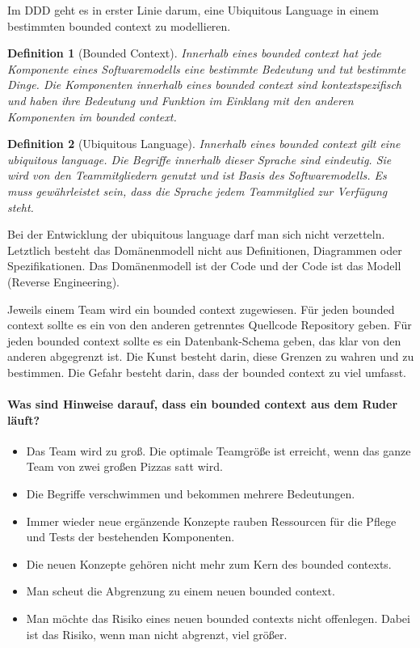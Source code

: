 \documentclass[11pt,a4paper]{scrartcl}
\newtheorem{Def}{Definition}[section]
\begin{document}
Im DDD geht es in erster Linie darum, eine Ubiquitous Language in einem bestimmten bounded context zu modellieren.

\begin{Def}[Bounded Context]
	Innerhalb eines bounded context hat jede Komponente eines Softwaremodells eine bestimmte Bedeutung und tut bestimmte Dinge. Die Komponenten innerhalb eines bounded context sind kontextspezifisch und haben ihre Bedeutung und Funktion im Einklang mit den anderen Komponenten im bounded context.
\end{Def}

\begin{Def}[Ubiquitous Language]
	Innerhalb eines bounded context gilt eine ubiquitous language. Die Begriffe innerhalb dieser Sprache sind eindeutig. Sie wird von den Teammitgliedern genutzt und ist Basis des Softwaremodells. Es muss gewährleistet sein, dass die Sprache jedem Teammitglied zur Verfügung steht.
\end{Def}

Bei der Entwicklung der ubiquitous language darf man sich nicht verzetteln. Letztlich besteht das Domänenmodell nicht aus Definitionen, Diagrammen oder Spezifikationen. Das Domänenmodell ist der Code und der Code ist das Modell (Reverse Engineering).

Jeweils einem Team wird ein bounded context zugewiesen. Für jeden bounded context sollte es ein von den anderen getrenntes Quellcode Repository geben. Für jeden bounded context sollte es ein Datenbank-Schema geben, das klar von den anderen abgegrenzt ist. Die Kunst besteht darin, diese Grenzen zu wahren und zu bestimmen. Die Gefahr besteht darin, dass der bounded context zu viel umfasst.

\paragraph{Was sind Hinweise darauf, dass ein bounded context aus dem Ruder läuft?}
\begin{itemize}
	\item Das Team wird zu groß. Die optimale Teamgröße ist erreicht, wenn das ganze Team von zwei großen Pizzas satt wird.
	\item Die Begriffe verschwimmen und bekommen mehrere Bedeutungen.
	\item Immer wieder neue ergänzende Konzepte rauben Ressourcen für die Pflege und Tests der bestehenden Komponenten.
	\item Die neuen Konzepte gehören nicht mehr zum Kern des bounded contexts.
	\item Man scheut die Abgrenzung zu einem neuen bounded context.
	\item Man möchte das Risiko eines neuen bounded contexts nicht offenlegen. Dabei ist das Risiko, wenn man nicht abgrenzt, viel größer.
\end{itemize}
\end{document}

